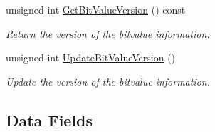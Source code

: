 \begin{DoxyCompactItemize}
unsigned int \hyperlink{classFunctionBehavior_abe80dcf891e6c460895fcf7f91c46fd9}{Get\+Bit\+Value\+Version} () const
\begin{DoxyCompactList}\small\item\em Return the version of the bitvalue information. \end{DoxyCompactList}\item 
unsigned int \hyperlink{classFunctionBehavior_a3c729f84a47cbe62a10bfd85d283ade2}{Update\+Bit\+Value\+Version} ()
\begin{DoxyCompactList}\small\item\em Update the version of the bitvalue information. \end{DoxyCompactList}\end{DoxyCompactItemize}
\subsection*{Data Fields}

